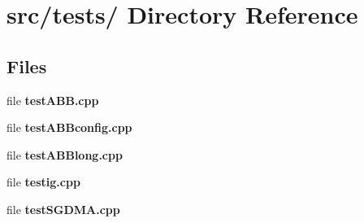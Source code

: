\hypertarget{dir_000004}{
\section{src/tests/ Directory Reference}
\label{dir_000004}
}
\subsection*{Files}
\begin{CompactItemize}
\item 
file {\bf testABB.cpp}
\item 
file {\bf testABBconfig.cpp}
\item 
file {\bf testABBlong.cpp}
\item 
file {\bf testig.cpp}
\item 
file {\bf testSGDMA.cpp}
\end{CompactItemize}
